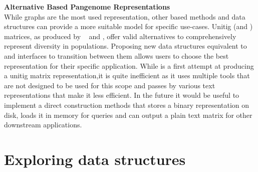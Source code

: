 \textbf{Alternative \kmer Based Pangenome Representations}\\
While graphs are the most used representation, other \kmer based methods and data structures can provide a more suitable model for specific use-cases. Unitig (and \kmer) matrices, as produced by  \kmt~\cite{kmtricks} and \muset, offer valid alternatives to comprehensively represent diversity in populations. Proposing new data structures equivalent to \ccdbgs and interfaces to transition between them allows users to choose the best representation for their specific application. While \muset is a first attempt at producing a unitig matrix representation,it is quite inefficient as it uses multiple tools that are not designed to be used for this scope and passes by various text representations that make it less efficient. In the future it would be useful to implement a direct construction methods that stores a binary representation on disk, loads it in memory for queries and can output a plain text matrix for other downstream applications. 


\section{Exploring \kmer data structures}


